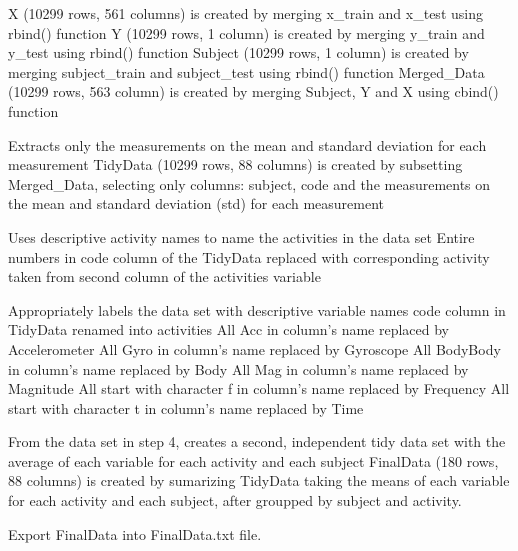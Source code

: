 \documentclass[
]{article}
\begin{document}
X (10299 rows, 561 columns) is created by merging x\_train and x\_test
using rbind() function Y (10299 rows, 1 column) is created by merging
y\_train and y\_test using rbind() function Subject (10299 rows, 1
column) is created by merging subject\_train and subject\_test using
rbind() function Merged\_Data (10299 rows, 563 column) is created by
merging Subject, Y and X using cbind() function

Extracts only the measurements on the mean and standard deviation for
each measurement TidyData (10299 rows, 88 columns) is created by
subsetting Merged\_Data, selecting only columns: subject, code and the
measurements on the mean and standard deviation (std) for each
measurement

Uses descriptive activity names to name the activities in the data set
Entire numbers in code column of the TidyData replaced with
corresponding activity taken from second column of the activities
variable

Appropriately labels the data set with descriptive variable names code
column in TidyData renamed into activities All Acc in column's name
replaced by Accelerometer All Gyro in column's name replaced by
Gyroscope All BodyBody in column's name replaced by Body All Mag in
column's name replaced by Magnitude All start with character f in
column's name replaced by Frequency All start with character t in
column's name replaced by Time

From the data set in step 4, creates a second, independent tidy data set
with the average of each variable for each activity and each subject
FinalData (180 rows, 88 columns) is created by sumarizing TidyData
taking the means of each variable for each activity and each subject,
after groupped by subject and activity.

Export FinalData into FinalData.txt file.
\end{document}

